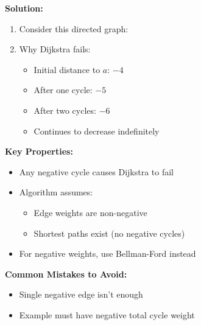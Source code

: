 \textbf{Solution:}
\begin{enumerate}[leftmargin=*,noitemsep]
    \item Consider this directed graph:
    \begin{center}
    \end{center}

    \item Why Dijkstra fails:
    \begin{itemize}[noitemsep]
        \item Initial distance to $a$: $-4$
        \item After one cycle: $-5$
        \item After two cycles: $-6$
        \item Continues to decrease indefinitely
    \end{itemize}
\end{enumerate}

\textbf{Key Properties:}
\begin{itemize}[noitemsep,leftmargin=*]
    \item Any negative cycle causes Dijkstra to fail
    \item Algorithm assumes:
        \begin{itemize}[noitemsep]
            \item Edge weights are non-negative
            \item Shortest paths exist (no negative cycles)
        \end{itemize}
    \item For negative weights, use Bellman-Ford instead
\end{itemize}

\textbf{Common Mistakes to Avoid:}
\begin{itemize}[noitemsep,leftmargin=*]
    \item Single negative edge isn't enough
    \item Example must have negative total cycle weight
\end{itemize}

\FloatBarrier
